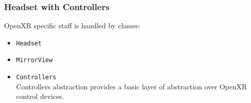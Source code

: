 \subsubsection{Headset with Controllers}
\label{sec:headset}
OpenXR specific staff is handled by classes:
\begin{itemize}
    \item \texttt{Headset}\\
    \item \texttt{MirrorView}\\
    \item \texttt{Controllers}\\
    Controllers abstraction provides a basic layer of abstraction over OpenXR control devices. 
\end{itemize}